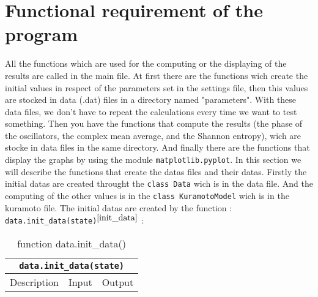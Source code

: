 \documentclass[1pt, a4paper]{article}
\begin{document}
\maketitlepage
\tableofcontents
\newpage
\noindent
\section{Functional requirement of the program}
\noindent
All the functions which are used for the computing or the displaying of the results are called in the main file. At first there are the functions wich create the initial values in respect of the parameters set in the settings file, then this values are stocked in data (.dat) files in a directory named "parameters". With these data files, we don't have to repeat the calculations every time we want to test something. Then you have the functions that compute the results (the phase of the oscillators, the complex mean average, and the Shannon entropy), wich are stocke in data files in the same directory. And finally there are the functions that display the graphs by using the module \texttt{matplotlib.pyplot}. In this section we will describe the functions that create the datas files and their datas. Firstly the initial datas are created throught the \texttt{class Data} wich is in the data file. And the computing of the other values is in the \texttt{class KuramotoModel} wich is in the kuramoto file.
The initial datas are created by the function : \texttt{data.init_data(state)}$^{\ref{init_data}}$ :  
\begin{table}[htbp]
    \begin{center}
        \begin{tabular}{ccc} \toprule
            \multicolumn{3}{c}{\texttt{data.init_data(state)}}\\
            \midrule
            Description & Input & Output\\
            \cmidrule(r){1-1} \cmidrule{2-2} \cmidrule(l){3-3}
            
            \bottomrule
        \end{tabular}
    \end{center}
    \caption{function data.init\_data()}\label{init_data}
\end{table}\\
\end{document}
